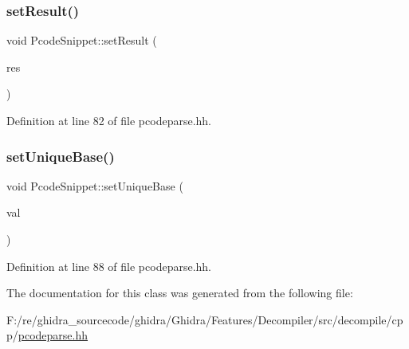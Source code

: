 \mbox{\label{class_pcode_snippet_a55276b8350568981fb7812b0e49a9ced}} 
\subsubsection{\texorpdfstring{setResult()}{setResult()}}
{\footnotesize\ttfamily void Pcode\+Snippet\+::set\+Result (\begin{DoxyParamCaption}\item[{\mbox{\hyperlink{class_construct_tpl}{Construct\+Tpl}} $\ast$}]{res }\end{DoxyParamCaption})\hspace{0.3cm}{\ttfamily [inline]}}



Definition at line 82 of file pcodeparse.\+hh.

\mbox{\label{class_pcode_snippet_a017937876cfc1862f422d9b2f493cf9d}} 
\subsubsection{\texorpdfstring{setUniqueBase()}{setUniqueBase()}}
{\footnotesize\ttfamily void Pcode\+Snippet\+::set\+Unique\+Base (\begin{DoxyParamCaption}\item[{\mbox{\hyperlink{types_8h_a2db313c5d32a12b01d26ac9b3bca178f}{uintb}}}]{val }\end{DoxyParamCaption})\hspace{0.3cm}{\ttfamily [inline]}}



Definition at line 88 of file pcodeparse.\+hh.



The documentation for this class was generated from the following file\+:\begin{DoxyCompactItemize}
\item 
F\+:/re/ghidra\+\_\+sourcecode/ghidra/\+Ghidra/\+Features/\+Decompiler/src/decompile/cpp/\mbox{\hyperlink{pcodeparse_8hh}{pcodeparse.\+hh}}\end{DoxyCompactItemize}
